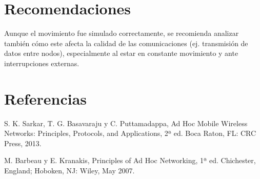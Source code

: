 \documentclass{article}
\begin{document}
\section{Recomendaciones}\label{secrecomen}

Aunque el movimiento fue simulado correctamente, se recomienda analizar también cómo este afecta la calidad de las comunicaciones (ej. transmisión de datos entre nodos), especialmente al estar en constante movimiento y ante interrupciones externas.

\section{Referencias}
\renewcommand{\refname}{}
\begin{thebibliography}{9}

 \label{ref:AdHoc} S. K. Sarkar, T. G. Basavaraju y C. Puttamadappa,
Ad Hoc Mobile Wireless Networks: Principles, Protocols, and Applications, 2ª ed.
Boca Raton, FL: CRC Press, 2013.

 \label{ref:PrinciplesAdHoc} M. Barbeau y E. Kranakis, Principles of Ad Hoc
Networking, 1ª ed. Chichester, England; Hoboken, NJ: Wiley, May 2007.

\end{thebibliography}
\end{document}
